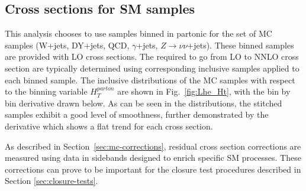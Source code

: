 \subsection{Cross sections for SM samples}
\label{sec:SMxs}
This analysis chooses to use \MADGRAPH samples binned in partonic \HT 
for the set of MC samples (W+jets, DY+jets, QCD, $\gamma$+jets, $Z\rightarrow \nu\nu$+jets).
These binned samples are provided with LO cross sections. 
The \kfactors required to go from LO to NNLO cross section are typically determined using corresponding
inclusive samples applied to each \HT binned sample.
The inclusive distributions of the MC samples
with respect to the binning variable
$H_{T}^{parton}$ are shown in Fig.~\ref{fig:Lhe_Ht}, with
the bin by bin derivative drawn below. 
As can be seen in the distributions, the stitched samples
exhibit a good level of smoothness,
further demonstrated by the derivative which shows a flat trend for each 
cross section.

As described in Section~\ref{sec:mc-corrections}, residual cross
section corrections are measured using data in sidebands designed to
enrich specific SM processes. These corrections can prove to be
important for the closure test procedures described in Section
\ref{sec:closure-tests}.

